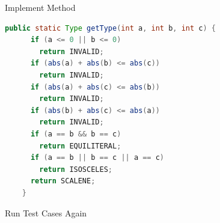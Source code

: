 \begin{Frame}[fragile]{Implement Method}
  \begin{lstlisting}[language=java,gobble=4,basicstyle=\ttfamily\footnotesize]
    public static Type getType(int a, int b, int c) {
      if (a <= 0 || b <= 0)
        return INVALID;
      if (abs(a) + abs(b) <= abs(c))
        return INVALID;
      if (abs(a) + abs(c) <= abs(b))
        return INVALID;
      if (abs(b) + abs(c) <= abs(a))
        return INVALID;
      if (a == b && b == c)
        return EQUILITERAL;
      if (a == b || b == c || a == c)
        return ISOSCELES;
      return SCALENE;
    }
  \end{lstlisting}
\end{Frame}

\begin{Frame}{Run Test Cases Again}
  \begin{center}
\end{center}
\end{Frame}
